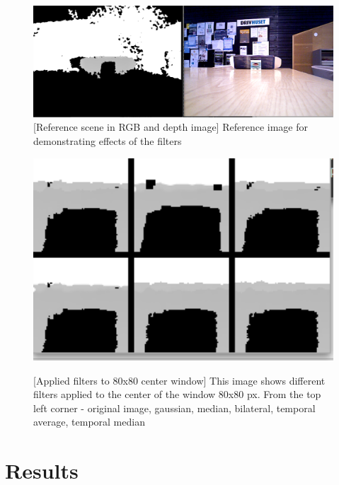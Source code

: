 \documentclass[11pt]{article}
\begin{document}
\begin{figure}[ht]
  \centering
  \includegraphics[width=1\textwidth]{figures/reference_rgb_depth.png}
  [Reference scene in RGB and depth image]{\label{fig:refimage} Reference image for demonstrating effects of the filters}
\end{figure}
\begin{figure}[ht]
  \centering
  \includegraphics[width=1\textwidth]{figures/applied_filters_center.png}
  
  [Applied filters to 80x80 center window]{\label{fig:filterswindow} This image shows different filters applied to the center of the window 80x80 px. From the top left corner - original image, gaussian, median, bilateral, temporal average, temporal median}
\end{figure}

\section{Results}


\end{document}
